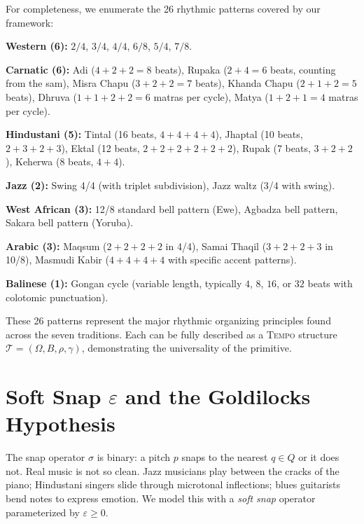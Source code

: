 \documentclass[cmj]{article}
\newcommand{\eps}{\varepsilon}
\newcommand{\TEMPO}{\textsc{Tempo}}
\begin{document}
For completeness, we enumerate the 26 rhythmic patterns covered by our
framework:

\noindent\textbf{Western (6):} $2/4$, $3/4$, $4/4$, $6/8$, $5/4$, $7/8$.

\noindent\textbf{Carnatic (6):} Adi ($4{+}2{+}2 = 8$ beats), Rupaka ($2{+}4 = 6$
beats, counting from the sam), Misra Chapu ($3{+}2{+}2 = 7$ beats), Khanda
Chapu ($2{+}1{+}2 = 5$ beats), Dhruva ($1{+}1{+}2{+}2 = 6$ matras per
cycle), Matya ($1{+}2{+}1 = 4$ matras per cycle).

\noindent\textbf{Hindustani (5):} Tintal (16 beats, $4{+}4{+}4{+}4$), Jhaptal
(10 beats, $2{+}3{+}2{+}3$), Ektal (12 beats, $2{+}2{+}2{+}2{+}2{+}2$),
Rupak (7 beats, $3{+}2{+}2$), Keherwa (8 beats, $4{+}4$).

\noindent\textbf{Jazz (2):} Swing 4/4 (with triplet subdivision), Jazz waltz
(3/4 with swing).

\noindent\textbf{West African (3):} 12/8 standard bell pattern (Ewe), Agbadza
bell pattern, Sakara bell pattern (Yoruba).

\noindent\textbf{Arabic (3):} Maqsum ($2{+}2{+}2{+}2$ in 4/4), Samai Thaqil
($3{+}2{+}2{+}3$ in 10/8), Masmudi Kabir ($4{+}4{+}4{+}4$ with specific
accent patterns).

\noindent\textbf{Balinese (1):} Gongan cycle (variable length, typically
$4$, $8$, $16$, or $32$ beats with colotomic punctuation).

These 26 patterns represent the major rhythmic organizing principles found
across the seven traditions. Each can be fully described as a \TEMPO{}
structure $\mathcal{T} = (\Omega, B, \rho, \gamma)$, demonstrating the
universality of the primitive.

\section{Soft Snap $\eps$ and the Goldilocks Hypothesis}
\label{sec:softsnap}

The snap operator $\sigma$ is binary: a pitch $p$ snaps to the nearest
$q \in Q$ or it does not. Real music is not so clean. Jazz musicians play
between the cracks of the piano; Hindustani singers slide through
microtonal inflections; blues guitarists bend notes to express emotion. We
model this with a \emph{soft snap} operator parameterized by $\eps \geq 0$.
\end{document}
